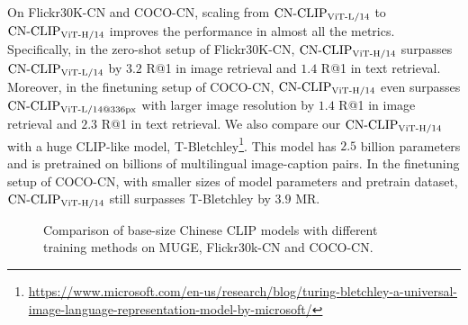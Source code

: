 \documentclass[11pt]{article}
\begin{document}
On Flickr30K-CN and COCO-CN, scaling from $\text{CN-CLIP}\rm_{ViT\text{-}L/14}$ to $\text{CN-CLIP}\rm_{ViT\text{-}H/14}$ improves the performance in almost all the metrics. Specifically, in the zero-shot setup of Flickr30K-CN, $\text{CN-CLIP}\rm_{ViT\text{-}H/14}$ surpasses $\text{CN-CLIP}\rm_{ViT\text{-}L/14}$ by $3.2$ R@1 in image retrieval and $1.4$ R@1 in text retrieval. Moreover, in the finetuning setup of COCO-CN, $\text{CN-CLIP}\rm_{ViT\text{-}H/14}$ even surpasses $\text{CN-CLIP}\rm_{ViT\text{-}L/14@336px}$ with larger image resolution by $1.4$ R@1 in image retrieval and $2.3$ R@1 in text retrieval. 
We also compare our $\text{CN-CLIP}\rm_{ViT\text{-}H/14}$ with a huge CLIP-like model, T-Bletchley\footnote{\url{https://www.microsoft.com/en-us/research/blog/turing-bletchley-a-universal-image-language-representation-model-by-microsoft/}}. This model has $2.5$ billion parameters and is pretrained on billions of multilingual image-caption pairs. In the finetuning setup of COCO-CN, with smaller sizes of model parameters and pretrain dataset, $\text{CN-CLIP}\rm_{ViT\text{-}H/14}$ still surpasses T-Bletchley by $3.9$ MR.

\begin{figure*}
    \centering
    \caption{Comparison of base-size Chinese CLIP models with different training methods on MUGE, Flickr30k-CN and COCO-CN.}
    \label{fig:ablation Base MR}
\end{figure*}
\end{document}

